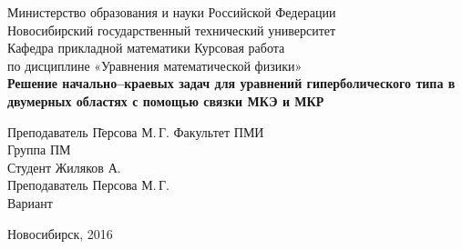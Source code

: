 \begin{titlepage}
    \begin{center}
        Министерство образования и науки Российской Федерации\\
        Новосибирский государственный технический университет\\
        Кафедра прикладной математики
        \vfill
        \Large
        Курсовая работа\\ 
        по дисциплине «Уравнения математической физики»\\
        \Huge
        \textbf{Решение начально--краевых задач для уравнений гиперболического типа в двумерных областях с помощью связки МКЭ и МКР}
    \end{center}

    \vfill

    \begin{tabbing}
        Преподаватель \quad\= Персова М.\,Г.\kill
        Факультет     \> ПМИ\\
        Группа        \> ПМ\\
        Студент       \> Жиляков А.\\
        Преподаватель \> Персова М.\,Г.\\
        Вариант       
    \end{tabbing}

    \vfill

    \begin{center}
        Новосибирск, 2016
    \end{center}
\end{titlepage} 